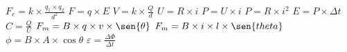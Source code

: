  $F_e=k\times \frac{q_1\times q_2}{d^2}$
 $F = q \times E$
 $V=k\times \frac{Q}{d}$
 $U = R \times i$
 $P = U \times i$
 $P = R \times i^2$
 $E = P \times \Delta t$
 $C =\frac{Q}{U}$
 $F_m= B \times  q  \times v \times \sen{\theta}$
 $F_m= B \times i \times l \times \sen{theta}$
 $\phi = B \times A \times \cos{\theta}$
 $\varepsilon = \frac{\Delta \Phi}{\Delta t}$
